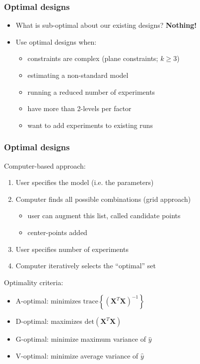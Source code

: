 \begin{frame}\frametitle{Optimal designs}
	\begin{itemize}
		\item	What is sub-optimal about our existing designs? \textbf{Nothing!}
		\item	Use optimal designs when:
		\begin{itemize}
			\item	constraints are complex (plane constraints; $k \geq 3$)
			\item	estimating a non-standard model
			\item	running a reduced number of experiments
			\item	have more than 2-levels per factor
			\item	want to add experiments to existing runs
		\end{itemize}
	\end{itemize}
\end{frame}

\begin{frame}\frametitle{Optimal designs}

	Computer-based approach:
	\begin{enumerate}
		\item	User specifies the model (i.e. the parameters)
		\item	Computer finds all possible combinations (grid approach)
		\begin{itemize}
			\item	user can augment this list, called candidate points
			\item	center-points added
		\end{itemize}
		\item	User specifies number of experiments
		\item	Computer iteratively selects the ``optimal'' set
	\end{enumerate}

	Optimality criteria:
	\begin{itemize}
		\item	A-optimal: minimizes $\text{trace}\left\{(\mathbf{X}^T\mathbf{X})^{-1}\right\}$
		\item	D-optimal: maximizes $\text{det}(\mathbf{X}^T\mathbf{X})$
		\item	G-optimal: minimize maximum variance of $\hat{y}$
		\item	V-optimal: minimize average variance of $\hat{y}$
	\end{itemize}
\end{frame}

